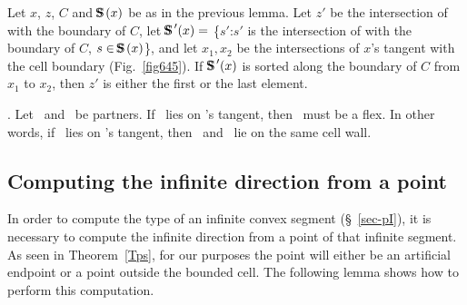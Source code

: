 
\begin{corollary}
\label{cor-645}
Let $x$, $z$, $C$ and $\mbox{S\hspace{-0.68em}S\hspace{.25em}}(x)$ be as in the previous lemma.
Let $z'$ be the intersection of  with the boundary of $C$,
let $\mbox{S\hspace{-0.68em}S\hspace{.25em}}'(x) =$ \{$s'$:$s'$ is the intersection of  with the 
boundary of $C$, $s \in \mbox{S\hspace{-0.68em}S\hspace{.25em}}(x)$\},
and let $x_{1},x_{2}$ be the intersections of $x$'s tangent with the cell boundary
{\rm (}Fig.~{\rm\ref{fig645})}.
If $\mbox{S\hspace{-0.68em}S\hspace{.25em}}'(x)$ is sorted along the boundary of $C$ from $x_{1}$ to $x_{2}$,
then $z'$ is either the first or the last element.
\end{corollary}

\begin{lemma}
\label{Ll}
{\rm \cite[p. 119]{jj}}.
Let \wo\ and \wt\ be partners.
If \wt\ lies on \wo's tangent, then \wo\ must be a flex.
In other words, if \wt\ lies on \wo's tangent, 
then \wo\ and \wt\ lie on the same cell wall.
\end{lemma}

\subsection{Computing the infinite direction from a point}

In order to compute the type of an infinite convex segment (\S~\ref{sec-pI}), 
it is necessary to compute the infinite direction from a point of that infinite segment.
As seen in Theorem~\ref{Tps}, for our purposes the point will either be an artificial
endpoint or a point outside the bounded cell.
The following lemma shows how to perform this computation.

